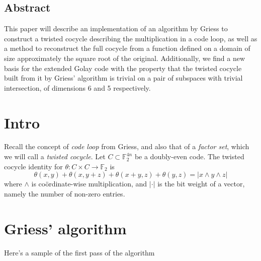 \documentclass[a4paper,debug]{tufte-handout}
\title{\TheTitle}
\date{\today}
\author{Ben Nagy and David Michael Roberts}
\newcommand{\F}{\mathbb{F}}
\theoremstyle{plain}
\theoremstyle{definition}
\theoremstyle{remark}
\begin{document}
\maketitle

\medskip

\subsection{Abstract}
\noindent This paper will describe an implementation of an algorithm by Griess to construct a twisted cocycle describing the multiplication in a code loop, as well as a method to reconstruct the full cocycle from a function defined on a domain of size approximately the square root of the original. 
Additionally, we find a new basis for the extended Golay code with the property that the twisted cocycle built from it by Griess' algorithm is trivial on a pair of subspaces with trivial intersection, of dimensions 6 and 5 respectively.


\section{Intro}
Recall the concept of \emph{code loop} from Griess\cite{Griess}, and also that of a \emph{factor set}, which we will call a \emph{twisted cocycle}. 
Let $C \subset \F_2^{4n}$ be a doubly-even code.
The twisted cocycle identity for $\theta\colon C\times C \to \F_2$ is
\[
	\theta(x,y) + \theta(x,y+z) + \theta(x+y,z) + \theta(y,z) = |x\wedge y \wedge z|
\]
where $\wedge$ is co\"ordinate-wise multiplication, and $|\cdot|$ is the bit weight of a vector, namely the number of non-zero entries.

\section{Griess' algorithm}

Here's a sample of the first pass of the algorithm
\end{document}
